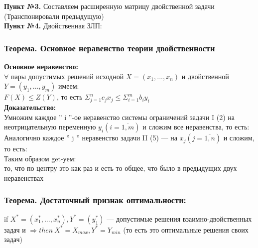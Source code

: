 \textbf{Пункт №3.} Составляем расширенную матрицу двойственной задачи (Транспонировали предыдущую)\\
\textbf{Пункт №4.} Двойственная ЗЛП:\\
\subsubsection{Теорема. Основное неравенство теории двойственности}
\textbf{Основное неравенство:}\\
$\forall$ пары допустимых решений исходной $X=(x_1,...,x_n)$ и двойственной $Y=(y_1,...,y_m)$ имеем:\\
$F(X) \leq Z(Y)$, то есть $\Sigma_{j=1}^n c_jx_j \leq \Sigma_{i=1}^m b_iy_i$\\
\textbf{Доказательство:}\\
Умножим каждое '' i ''-ое неравенство системы ограничений задачи I (2) на неотрицательную переменную $y_i (i=\overline{1,m})$ и сложим все неравенства, то есть:\\
Аналогично каждое '' j '' неравенство задачи II (5) --- на $x_j (j=\overline{1,n})$ и сложим, то есть:\\
Таким образом get-уем:\\
то, что по центру это как раз и есть то общее, что было в предыдущих двух неравенствах
\qedsymbol\\
\subsubsection{Теорема. Достаточный признак оптимальности:}
if $X^*=(x_1^*,...,x_n^*), Y^*=(y_1^*)$ --- допустимые решения взаимно-двойственных задач и 
$\Rightarrow then \ X^* =X_{max}, Y^*=Y_{min}$ (то есть это оптимальные решения своих задач)\\

